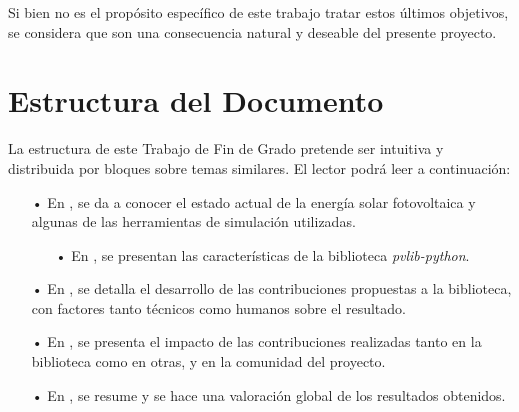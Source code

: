 Si bien no es el propósito específico de este trabajo tratar estos últimos objetivos, se considera que son una consecuencia natural y deseable del presente proyecto.


\section{Estructura del Documento} \label{sct:intro_estructura}

La estructura de este Trabajo de Fin de Grado pretende ser intuitiva y distribuida por bloques sobre temas similares. El lector podrá leer a continuación:

\begin{itemize}

    \item[•] En , se da a conocer el estado actual de la energía solar fotovoltaica y algunas de las herramientas de simulación utilizadas.

        \begin{itemize}
            \item[•] En , se presentan las características de la biblioteca \textit{pvlib-python}.
        \end{itemize}

    \item[•] En , se detalla el desarrollo de las contribuciones propuestas a la biblioteca, con factores tanto técnicos como humanos sobre el resultado.

    \item[•] En , se presenta el impacto de las contribuciones realizadas tanto en la biblioteca como en otras, y en la comunidad del proyecto.

    \item[•] En , se resume y se hace una valoración global de los resultados obtenidos.


\end{itemize}


